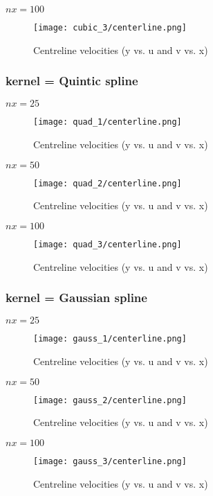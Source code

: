 \documentclass{article}
\begin{document}
\newpage
$nx = 100 $
\\
\begin{figure}[H]   \label{figure}
\texttt{[image: cubic\_3/centerline.png]}
\caption{Centreline velocities (y vs. u and v vs. x)}
\label{figure:}
\end{figure}
\newpage

\subsubsection{kernel = Quintic spline}
$nx = 25 $
\\
\begin{figure}[H]   \label{figure}
\texttt{[image: quad\_1/centerline.png]}
\caption{Centreline velocities (y vs. u and v vs. x)}
\label{figure:}
\end{figure}

\newpage
$nx = 50 $
\\
\begin{figure}[H]   \label{figure}
\texttt{[image: quad\_2/centerline.png]}
\caption{Centreline velocities (y vs. u and v vs. x)}
\label{figure:}
\end{figure}

\newpage
$nx = 100 $
\\
\begin{figure}[H]   \label{figure}
\texttt{[image: quad\_3/centerline.png]}
\caption{Centreline velocities (y vs. u and v vs. x)}
\label{figure:}
\end{figure}

\newpage
\subsubsection{kernel = Gaussian spline}
$nx = 25 $
\\
\begin{figure}[H]   \label{figure}
\texttt{[image: gauss\_1/centerline.png]}
\caption{Centreline velocities (y vs. u and v vs. x)}
\label{figure:}
\end{figure}

\newpage
$nx = 50 $
\\
\begin{figure}[H]   \label{figure}
\texttt{[image: gauss\_2/centerline.png]}
\caption{Centreline velocities (y vs. u and v vs. x)}
\label{figure:}
\end{figure}

\newpage
$nx = 100 $
\\
\begin{figure}[H]   \label{figure}
\texttt{[image: gauss\_3/centerline.png]}
\caption{Centreline velocities (y vs. u and v vs. x)}
\label{figure:}
\end{figure}
\end{document}
